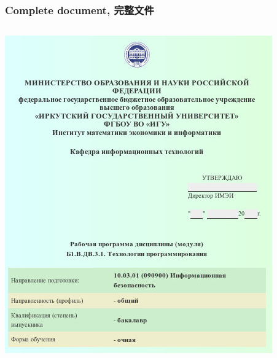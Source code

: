 \documentclass[10pt]{beamer}
\begin{document}
\begin{frame}
  \frametitle{Complete document, 完整文件}
  \begin{adjustwidth}{-2.5em}{-2.5em}
    \begin{center}
      \begin{columns}
        \begin{column}{0.5\linewidth}
          \includegraphics[width=1\linewidth]{work-program-title.jpg}
        \end{column}
        \begin{column}{0.5\linewidth}

\end{column}
\end{columns}
\end{center}
\end{adjustwidth}
\end{frame}
\end{document}
